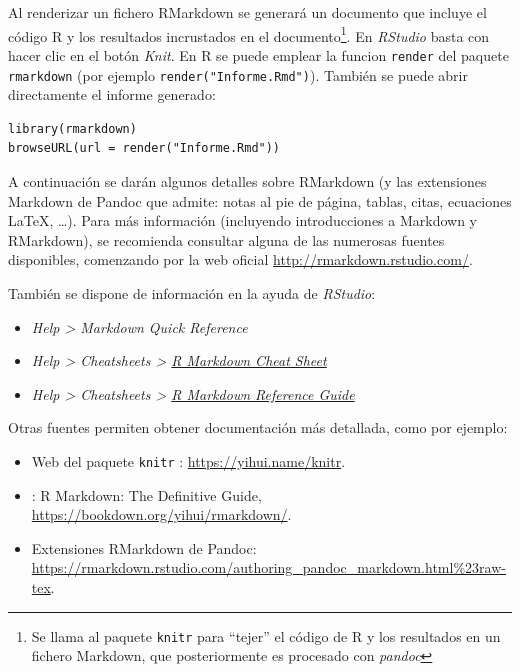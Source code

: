 \documentclass[]{book}
\let\rmarkdownfootnote\footnote%
\def\footnote{\protect\rmarkdownfootnote}
\theoremstyle{definition}
\theoremstyle{definition}
\theoremstyle{definition}
\theoremstyle{remark}
\begin{document}
Al renderizar un fichero RMarkdown se generará un documento que incluye
el código R y los resultados incrustados en el documento\footnote{Se
  llama al paquete \texttt{knitr} para ``tejer'' el código de R y los
  resultados en un fichero Markdown, que posteriormente es procesado con
  \emph{pandoc}}. En \emph{RStudio} basta con hacer clic en el botón
\emph{Knit}. En R se puede emplear la funcion \texttt{render} del
paquete \texttt{rmarkdown} (por ejemplo \texttt{render("Informe.Rmd")}).
También se puede abrir directamente el informe generado:

\begin{verbatim}
library(rmarkdown)
browseURL(url = render("Informe.Rmd"))
\end{verbatim}

A continuación se darán algunos detalles sobre RMarkdown (y las
extensiones Markdown de Pandoc que admite: notas al pie de página,
tablas, citas, ecuaciones LaTeX, \ldots{}). Para más información
(incluyendo introducciones a Markdown y RMarkdown), se recomienda
consultar alguna de las numerosas fuentes disponibles, comenzando por la
web oficial \url{http://rmarkdown.rstudio.com/}.

También se dispone de información en la ayuda de \emph{RStudio}:

\begin{itemize}
\item
  \emph{Help \textgreater{} Markdown Quick Reference}
\item
  \emph{Help \textgreater{} Cheatsheets \textgreater{}
  \href{https://www.rstudio.org/links/r_markdown_cheat_sheet}{R Markdown
  Cheat Sheet}}
\item
  \emph{Help \textgreater{} Cheatsheets \textgreater{}
  \href{https://www.rstudio.com/wp-content/uploads/2015/03/rmarkdown-reference.pdf}{R
  Markdown Reference Guide}}
\end{itemize}

Otras fuentes permiten obtener documentación más detallada, como por
ejemplo:

\begin{itemize}
\item
  Web del paquete \texttt{knitr} \citep{R-knitr}:
  \url{https://yihui.name/knitr}.
\item
  \citet{xie2018r} : R Markdown: The Definitive Guide,
  \url{https://bookdown.org/yihui/rmarkdown/}.
\item
  Extensiones RMarkdown de Pandoc:
  \url{https://rmarkdown.rstudio.com/authoring_pandoc_markdown.html\%23raw-tex}.
\end{itemize}
\end{document}
